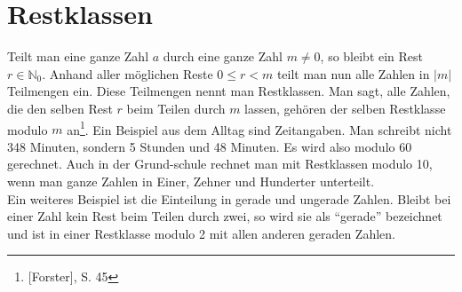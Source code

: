 \section{Restklassen}
Teilt man eine ganze Zahl $a$ durch eine ganze Zahl $m \neq 0$, so 
bleibt ein Rest $r \in \mathbb{N}_0$. Anhand aller möglichen Reste
$0 \leq r < m$ teilt man nun alle Zahlen in $|m|$ Teilmengen ein. 
Diese Teilmengen nennt man Restklassen. Man sagt, alle Zahlen, die 
den selben Rest $r$ beim Teilen durch $m$ lassen, gehören der selben 
Restklasse modulo $m$ an\footnote{[Forster], S. 45}. 
Ein Beispiel aus dem Alltag sind Zeitangaben. Man schreibt nicht 348 
Minuten, sondern 5 Stunden und 48 Minuten. Es wird also modulo 60 
gerechnet. Auch in der Grund-schule rechnet man mit Restklassen 
modulo 10, wenn man ganze Zahlen in Einer, Zehner und Hunderter 
unterteilt.\\
Ein weiteres Beispiel ist die Einteilung in  gerade und ungerade 
Zahlen. Bleibt bei einer Zahl kein Rest beim Teilen durch zwei, so 
wird sie als "`gerade"' bezeichnet und ist in einer Restklasse 
modulo 2 mit allen anderen geraden Zahlen.
